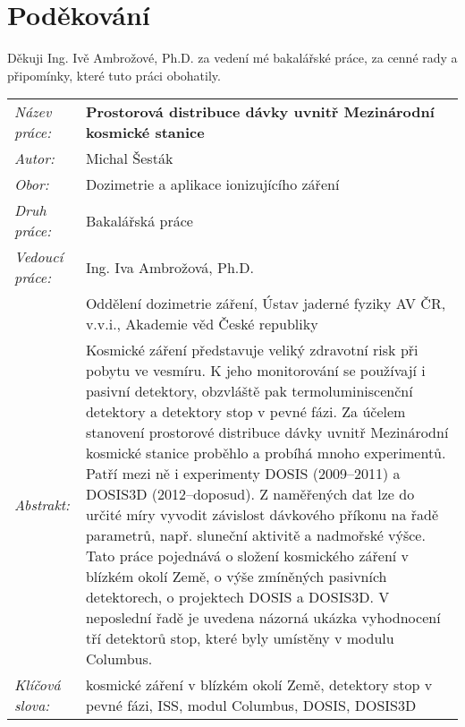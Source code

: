 \section*{Poděkování}
Děkuji Ing. Ivě Ambrožové, Ph.D. za vedení mé bakalářské práce, za cenné rady a připomínky, které tuto práci obohatily.
\newpage
\begin{tabularx}{\textwidth}{>{\itshape}l X}
  Název práce: & \textbf{Prostorová distribuce dávky uvnitř Mezinárodní kosmické stanice}\\
  Autor: & Michal Šesták\\
  Obor: & Dozimetrie a aplikace ionizujícího záření\\
  Druh práce: & Bakalářská práce\\
  Vedoucí práce: & Ing. Iva Ambrožová, Ph.D.\\ 
               & Oddělení dozimetrie záření, Ústav jaderné fyziky AV ČR, v.v.i., Akademie věd České republiky\\
  Abstrakt: & Kosmické záření představuje veliký zdravotní risk při pobytu ve vesmíru. K jeho monitorování se používají i pasivní detektory, obzvláště pak termoluminiscenční detektory a detektory stop v pevné fázi. Za účelem stanovení prostorové distribuce dávky uvnitř Mezinárodní kosmické stanice proběhlo a probíhá mnoho experimentů. Patří mezi ně i experimenty DOSIS (2009--2011) a DOSIS3D (2012--doposud). Z naměřených dat lze do určité míry vyvodit závislost dávkového příkonu na řadě parametrů, např. sluneční aktivitě a nadmořské výšce. 
  Tato práce pojednává o složení kosmického záření v blízkém okolí Země, o výše zmíněných pasivních detektorech, o projektech DOSIS a DOSIS3D. V neposlední řadě je uvedena názorná ukázka vyhodnocení tří detektorů stop, které byly umístěny v modulu Columbus. \\
  Klíčová slova: & kosmické záření v blízkém okolí Země, detektory stop v pevné fázi, ISS, modul Columbus, DOSIS, DOSIS3D
\end{tabularx}
\newpage
